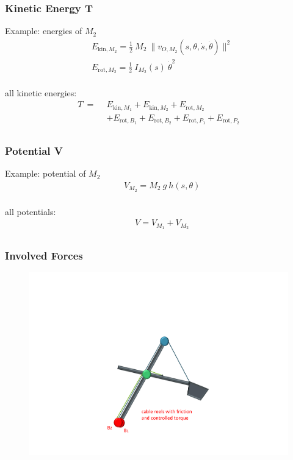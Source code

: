 \begin{frame}
	\frametitle{Kinetic Energy T}
	
	Example: energies of $M_2$ 
	\begin{align*}
		&E_{\text{kin},M_2} = \frac{1}{2}\ M_2\ \| 
		v_{O,M_2}(s,\theta,\dot{s},\dot{\theta}) \|^2 \\
		&E_{\text{rot},M_2} = \frac{1}{2}\ I_{M_2}(s)\ \dot{\theta}^2 \\
	\end{align*}
	
	all kinetic energies:
	\begin{align*}
	T\ =\ \ & E_{\text{kin},M_1} + E_{\text{kin},M_2} + E_{\text{rot},M_2}  \\
	& + E_{\text{rot},B_1} + E_{\text{rot},B_2} + E_{\text{rot},P_1} + E_{\text{rot},P_2} \\
	\end{align*}
\end{frame}

\begin{frame}
	\frametitle{Potential V}
	
	Example: potential of $M_2$
	\begin{align*}
		& V_{M_2} = M_2\ g\ h(s,\theta) \\
	\end{align*}
	
	all potentials:
	\begin{align*}
		& V = V_{M_1} + V_{M_2} \\
	\end{align*}
\end{frame}



\begin{frame}
	\frametitle{Involved Forces}
	\begin{figure}[bth]
	  \begin{center}
	    \includegraphics[trim=22cm 5cm 2cm 24cm, clip=true, 
	    width=\linewidth]{img/Excavator_Only1}
	  \end{center}
	\end{figure}

\end{frame}

